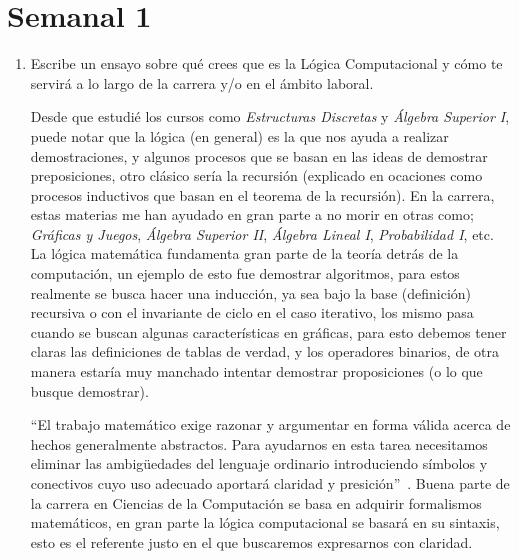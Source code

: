 \documentclass{article}
\begin{document}
\section*{\LARGE{Semanal 1}}
\begin{enumerate}
\item Escribe un ensayo sobre qué crees que es la Lógica Computacional
  y cómo te servirá a lo largo de la carrera y/o en el ámbito laboral.
  
  Desde que estudié los cursos como \textit{Estructuras Discretas} y
  \textit{Álgebra Superior I}, puede notar que la lógica (en general)
  es la que nos ayuda a realizar demostraciones, y algunos procesos
  que se basan en las ideas de demostrar preposiciones, otro clásico
  sería la recursión (explicado en ocaciones como procesos inductivos
  que basan en el teorema de la recursión). En la carrera, estas
  materias me han ayudado en gran parte a no morir en otras como;
  \textit{Gráficas y Juegos}, \textit{Álgebra Superior II},
  \textit{Álgebra Lineal I}, \textit{Probabilidad I}, etc. La lógica
  matemática fundamenta gran parte de la teoría detr\'as de la computación,
  un ejemplo de esto fue demostrar algoritmos, para estos realmente
  se busca hacer una inducción, ya sea bajo la base (definición) recursiva
  o con el invariante de ciclo en el caso iterativo, los mismo pasa
  cuando se buscan algunas características en gráficas, para esto debemos
  tener claras las definiciones de tablas de verdad, y los operadores
  binarios, de otra manera estaría muy manchado intentar demostrar
  proposiciones (o lo que busque demostrar).
  
  ``El trabajo matemático exige razonar y argumentar en forma válida
  acerca de hechos generalmente abstractos. Para ayudarnos en esta
  tarea necesitamos eliminar las ambigüedades del lenguaje ordinario
  introduciendo símbolos y conectivos cuyo uso adecuado aportará claridad
  y presición''~\cite{CA}. Buena parte de la carrera en Ciencias de la
  Computación se basa en adquirir formalismos matemáticos, en gran parte
  la lógica computacional se basará en su sintaxis, esto es el referente
  justo en el que buscaremos expresarnos con claridad.
  

\end{enumerate}
\end{document}
